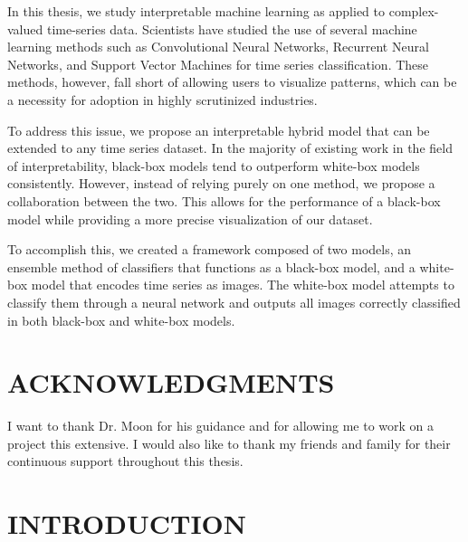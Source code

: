 \documentclass{turabian-thesis}[12pt]
\begin{document}

In this thesis, we study interpretable machine learning as applied to complex-valued time-series data. Scientists have studied the use of several machine learning methods such as Convolutional Neural Networks, Recurrent Neural Networks, and Support Vector Machines for time series classification. These methods, however, fall short of allowing users to visualize patterns, which can be a necessity for adoption in highly scrutinized industries.

To address this issue, we propose an interpretable hybrid model that can be extended to any time series dataset. In the majority of existing work in the field of interpretability, black-box models tend to outperform white-box models consistently. However, instead of relying purely on one method, we propose a collaboration between the two. This allows for the performance of a black-box model while providing a more precise visualization of our dataset.

To accomplish this, we created a framework composed of two models, an ensemble method of classifiers that functions as a black-box model, and a white-box model that encodes time series as images. The white-box model attempts to classify them through a neural network and outputs all images correctly classified in both black-box and white-box models.

\chapter{ACKNOWLEDGMENTS}

I want to thank Dr. Moon for his guidance and for allowing me to work on a project this extensive. I would also like to thank my friends and family for their continuous support throughout this thesis.

\newpage
\tableofcontents
\newpage

\renewcommand{\listfigurename}{LIST OF FIGURES}
\listoffigures

\mainmatter
\chapter{INTRODUCTION}
\label{chap:introduction}
\end{document}
